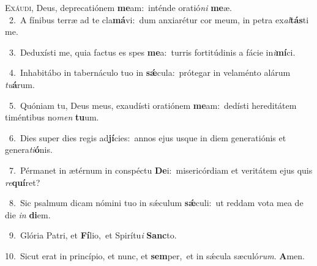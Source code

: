 \lettrine{\initial\textcolor{\initialcolor}{E}}{xáudi,} Deus, deprecatiónem \textbf{me}\-am:~\star inténde oratió\textit{ni} \textbf{me}\-æ.\\
{\numbfont\textcolor{\numbcolor}{~2.}}~A fínibus terræ ad te cla\-\textbf{má}\-vi:~\star dum anxiarétur cor meum, in petra ex\-\textit{al}\-\textbf{tás}ti me.\par
{\numbfont\textcolor{\numbcolor}{~3.}}~Deduxísti me, quia factus es spes \textbf{me}\-a:~\star turris fortitúdinis a fácie in\-\textit{i}\-\textbf{mí}ci.\par
{\numbfont\textcolor{\numbcolor}{~4.}}~Inhabitábo in tabernáculo tuo in \textbf{sǽ}\-cula:~\star prótegar in velaménto alárum \textit{tu}\-\textbf{á}rum.\par
{\numbfont\textcolor{\numbcolor}{~5.}}~Quóniam tu, Deus meus, exaudísti oratiónem \textbf{me}\-am:~\star dedísti hereditátem timéntibus no\textit{men} \textbf{tu}\-um.\par
{\numbfont\textcolor{\numbcolor}{~6.}}~Dies super dies regis ad\-\textbf{jí}\-cies:~\star annos ejus usque in diem generatiónis et genera\-\textit{ti}\-\textbf{ó}nis.\par
{\numbfont\textcolor{\numbcolor}{~7.}}~Pérmanet in ætérnum in conspéctu \textbf{De}\-i:~\star misericórdiam et veritátem ejus quis \textit{re}\-\textbf{quí}ret?\par
{\numbfont\textcolor{\numbcolor}{~8.}}~Sic psalmum dicam nómini tuo in sǽculum \textbf{sǽ}\-culi:~\star ut reddam vota mea de die \textit{in} \textbf{di}\-em.\par
{\numbfont\textcolor{\numbcolor}{~9.}}~Glória Patri, et \textbf{Fí}\-lio,~\star et Spirítu\textit{i} \textbf{Sanc}\-to.\par
{\numbfont\textcolor{\numbcolor}{10.}}~Sicut erat in princípio, et nunc, et \textbf{sem}\-per,~\star et in sǽcula sæculó\-\textit{rum}\-. \textbf{A}\-men.\par
